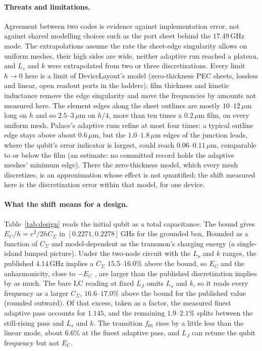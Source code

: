\documentclass{anvil-paper}
\begin{document}
\paragraph{Threats and limitations.}
Agreement between two codes is evidence against implementation error, not
against shared modelling choices such as the port sheet behind the
$17.49$\,GHz mode. The extrapolations assume the rate the sheet-edge
singularity allows on uniform meshes, their high sides are wide, neither
adaptive run reached a plateau, and $L_s$ and $k$ were extrapolated from
two or three discretizations. Every limit $h \to 0$ here is a limit of
DeviceLayout's model (zero-thickness PEC sheets, lossless and linear, open
readout ports in the ladders); film thickness and kinetic inductance remove
the edge singularity and move the frequencies by amounts not measured
here. The element edges
along the sheet outlines are mostly $10$--$12\,\mu$m long on $h$ and so
$2.5$--$3\,\mu$m on $h/4$, more than ten times a $0.2\,\mu$m film, on
every uniform mesh. Palace's adaptive runs refine at most four times: a
typical outline edge stays above about $0.6\,\mu$m, but the
$1.0$--$1.8\,\mu$m edges of the junction leads, where the qubit's error
indicator is largest, could reach $0.06$--$0.11\,\mu$m, comparable to or
below the film (an estimate: no committed record holds the adaptive
meshes' minimum edge). There the zero-thickness model, which every mesh
discretizes, is an approximation whose effect is not quantified; the shift
measured here is the discretization error within that model, for one
device.

\paragraph{What the shift means for a design.}
Table~\ref{tab:design} reads the initial qubit as a total capacitance. The
bound gives $E_C/h = e^2/2hC_\Sigma$ in $[0.2271, 0.2278]$\,GHz for the
grounded box, Bounded as a function of $C_\Sigma$ and model-dependent as
the transmon's charging energy (a single-island lumped picture). Under the
two-node circuit with the $L_s$ and $k$ ranges, the published $4.14$\,GHz
implies a $C_\Sigma$ $15.5$--$16.0\%$ above the bound, so $E_C$ and the
anharmonicity, close to $-E_C$ \citep{koch2007charge}, are larger than the
published discretization implies by as much. The bare LC reading at fixed
$L_J$ omits $L_s$ and $k$, so it reads every frequency as a larger
$C_\Sigma$, $16.6$--$17.0\%$ above the bound for the published value
(rounded outward). Of that excess, taken as a factor, the measured finest adaptive pass accounts
for $1.145$, and the remaining $1.9$--$2.1\%$ splits between the still-rising pass and $L_s$ and $k$. The transition $f_{01}$ rises by a
little less than the linear mode, about $6.6\%$ at the finest adaptive pass, and
$L_J$ can retune the qubit frequency but not $E_C$.
\end{document}
